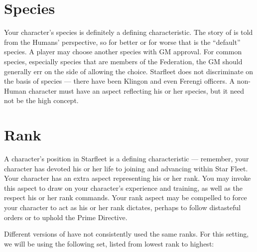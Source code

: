 \documentclass[12pt,titlepage,openany]{book}
\begin{document}
\section{Species}\label{sec:species}

Your character's species is definitely a defining characteristic. The story of
\StarTrek{} is told from the Humans' perspective, so for better or for worse
that is the ``default'' species. A player may choose another species with GM
approval. For common species, especially species that are members of the
Federation, the GM should generally err on the side of allowing the choice.
Starfleet does not discriminate on the basis of species --- there have been
Klingon and even Ferengi officers. A non-Human character must have an aspect
reflecting his or her species, but it need not be the high concept.

\section{Rank}\label{sec:rank}

A character's position in Starfleet is a defining characteristic --- remember,
your character has devoted his or her life to joining and advancing within Star
Fleet. Your character has an extra aspect representing his or her rank. You may
invoke this aspect to draw on your character's experience and training, as well
as the respect his or her rank commands. Your rank aspect may be compelled to
force your character to act as his or her rank dictates, perhaps to follow
distasteful orders or to uphold the Prime Directive.


Different versions of \StarTrek{} have not consistently used the same ranks.
For this setting, we will be using the following set, listed from lowest rank
to highest:
\end{document}
